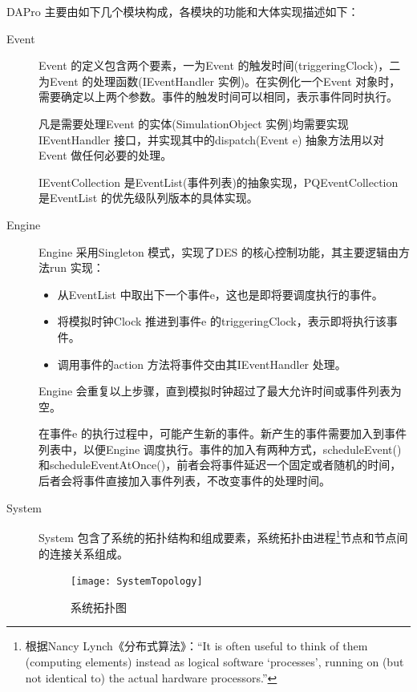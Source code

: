     DAPro 主要由如下几个模块构成，各模块的功能和大体实现描述如下：
    \begin{description}
        \item[Event] Event 的定义包含两个要素，一为Event 的触发时间(triggeringClock)，二为Event 的处理函数(IEventHandler 实例)。在实例化一个Event 对象时，需要确定以上两个参数。事件的触发时间可以相同，表示事件同时执行。
            
            凡是需要处理Event 的实体(SimulationObject 实例)均需要实现IEventHandler 接口，并实现其中的dispatch(Event e) 抽象方法用以对Event 做任何必要的处理。
            
            IEventCollection 是EventList(事件列表)的抽象实现，PQEventCollection 是EventList 的优先级队列版本的具体实现。
        
        \item[Engine] Engine 采用Singleton 模式，实现了DES 的核心控制功能，其主要逻辑由方法run 实现：
            \begin{itemize}
                \item 从EventList 中取出下一个事件e，这也是即将要调度执行的事件。
                \item 将模拟时钟Clock 推进到事件e 的triggeringClock，表示即将执行该事件。
                \item 调用事件的action 方法将事件交由其IEventHandler 处理。
            \end{itemize}
            
            Engine 会重复以上步骤，直到模拟时钟超过了最大允许时间或事件列表为空。
            
            在事件e 的执行过程中，可能产生新的事件。新产生的事件需要加入到事件列表中，以便Engine 调度执行。事件的加入有两种方式，scheduleEvent() 和scheduleEventAtOnce()，前者会将事件延迟一个固定或者随机的时间，后者会将事件直接加入事件列表，不改变事件的处理时间。
        
        \item[System] System 包含了系统的拓扑结构和组成要素，系统拓扑由进程\footnote{根据Nancy Lynch《分布式算法》：“It is often useful to think of them (computing elements) instead as logical software ‘processes’, running on (but not identical to) the actual hardware processors.”}节点和节点间的连接关系组成。
            \begin{figure}[ht]
                \centering
                \texttt{[image: SystemTopology]}\\
                \caption{系统拓扑图}\label{SystemTopology}
            \end{figure}
            

\end{description}
